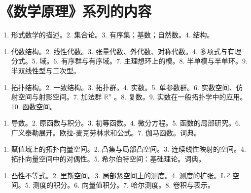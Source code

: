 \chapter*{《数学原理》系列的内容}
{}


\begin{enumerate}
\def\labelenumi{\arabic{enumi}.}
\tightlist
\item
  形式数学的描述。2. 集合论。3. 有序集；基数；自然数。4. 结构。
\end{enumerate}


\begin{enumerate}
\def\labelenumi{\arabic{enumi}.}
\tightlist
\item
  代数结构。2. 线性代数。3. 张量代数、外代数、对称代数。4. 多项式与有理分式。5. 域。6. 有序群与有序域。7. 主理想环上的模。8. 半单模与半单环。9. 半双线性型与二次型。
\end{enumerate}


\begin{enumerate}
\def\labelenumi{\arabic{enumi}.}
\tightlist
\item
  拓扑结构。2. 一致结构。3. 拓扑群。4. 实数。5. 单参数群。6. 实数空间、仿射空间与射影空间。7. 加法群 \(\mathbb{R}^n\) 。8. 复数。9. 实数在一般拓扑学中的应用。10. 函数空间。
\end{enumerate}


\begin{enumerate}
\def\labelenumi{\arabic{enumi}.}
\tightlist
\item
  导数。2. 原函数与积分。3. 初等函数。4. 微分方程。5. 函数的局部研究。6. 广义泰勒展开。欧拉-麦克劳林求和公式。7. 伽马函数。词典。
\end{enumerate}


\begin{enumerate}
\def\labelenumi{\arabic{enumi}.}
\tightlist
\item
  赋值域上的拓扑向量空间。2. 凸集与局部凸空间。3. 连续线性映射的空间。4. 拓扑向量空间中的对偶性。5. 希尔伯特空间：基础理论。词典。
\end{enumerate}


\begin{enumerate}
\def\labelenumi{\arabic{enumi}.}
\tightlist
\item
  凸性不等式。2. 里斯空间。3. 局部紧空间上的测度。4. 测度的扩张。L \(^{p}\) 空间。5. 测度的积分。6. 向量值积分。7. 哈尔测度。8. 卷积与表示。
\end{enumerate}

